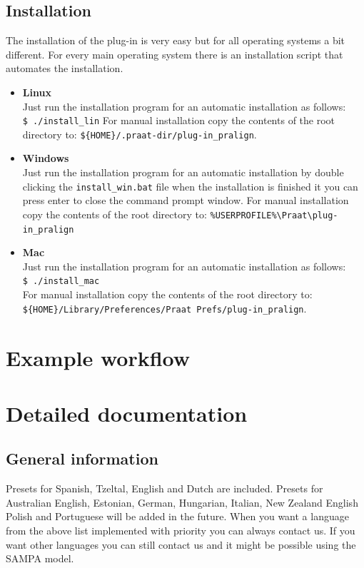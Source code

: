\documentclass[twoside,a4paper]{book}
\begin{document}
\section{Installation}
The installation of the plug-in is very easy but for all operating systems a bit
different. For every main operating system there is an installation script that
automates the installation.
\begin{itemize}
	\item \textbf{Linux}\\
		Just run the installation program for an automatic installation as
		follows:\\
		\texttt{\$ ./install\_lin}
		For manual installation copy the contents of the root directory to:
		\texttt{\$\{HOME\}/.praat-dir/plug-in\_pralign}.
	\item \textbf{Windows}\\
		Just run the installation program for an automatic installation by double
		clicking the \texttt{install\_win.bat} file when the installation is
		finished it you can press enter to close the command prompt window.
		For manual installation copy the contents of the root directory to:
		\texttt{\%USERPROFILE\%\textbackslash Praat\textbackslash plug-in\_pralign}
	\item \textbf{Mac}\\
		Just run the installation program for an automatic installation as
		follows:\\
		\texttt{\$ ./install\_mac}\\
		For manual installation copy the contents of the root directory to:
		\texttt{\$\{HOME\}/Library/Preferences/Praat Prefs/plug-in\_pralign}.
\end{itemize}

\chapter{Example workflow}

\chapter{Detailed documentation}
\section{General information}
Presets for Spanish, Tzeltal, English and Dutch are included. Presets for
Australian English, Estonian, German, Hungarian, Italian, New Zealand English
Polish and Portuguese will be added in the future. When you want a language
from the above list implemented with priority you can always contact us. If you
want other languages you can still contact us and it might be possible using
the SAMPA model.
\end{document}
